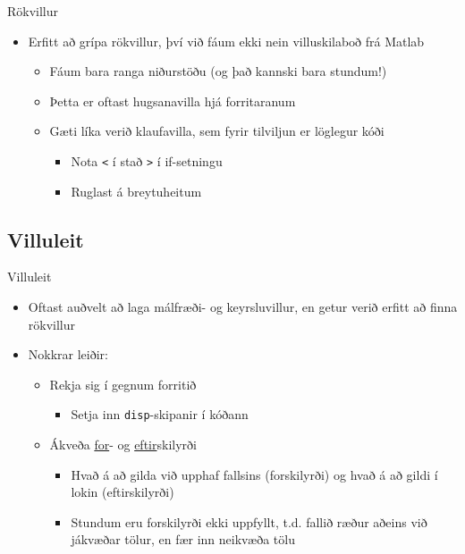 \documentclass{beamer}
\begin{document}
\begin{frame}{Rökvillur}
\begin{itemize}
 \item Erfitt að grípa rökvillur, því við fáum ekki nein villuskilaboð frá Matlab
  \begin{itemize}
   \item Fáum bara ranga niðurstöðu (og það kannski bara stundum!)
   \item Þetta er oftast hugsanavilla hjá forritaranum
   \item Gæti líka verið klaufavilla, sem fyrir tilviljun er löglegur kóði
   \begin{itemize}
    \item Nota \texttt{<} í stað \texttt{>} í if-setningu
    \item Ruglast á breytuheitum
   \end{itemize}
  \end{itemize}
 \end{itemize}
\end{frame}

\subsection{Villuleit}

\begin{frame}{Villuleit}
\begin{itemize}
 \item Oftast auðvelt að laga málfræði- og keyrsluvillur, en getur verið erfitt að finna rökvillur
 \item  Nokkrar leiðir:
 \begin{itemize}
  \item Rekja sig í gegnum forritið
  \begin{itemize}
   \item Setja inn \texttt{disp}-skipanir í kóðann
  \end{itemize}
 \end{itemize}
 \begin{itemize}
  \item Ákveða \underline{for}- og \underline{eftir}skilyrði
  \begin{itemize}
   \item Hvað á að gilda við upphaf fallsins (forskilyrði) og hvað á að gildi í lokin (eftirskilyrði)
   \item Stundum eru forskilyrði ekki uppfyllt, t.d. fallið ræður aðeins við jákvæðar tölur, en fær inn neikvæða tölu
  \end{itemize}
 \end{itemize}
\end{itemize}
\end{frame}
\end{document}
